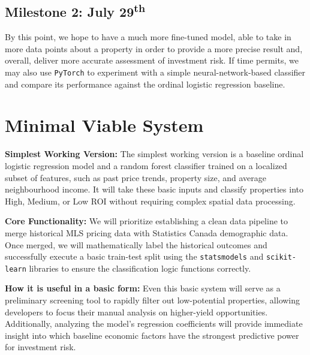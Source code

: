 \documentclass{article}
\begin{document}
\subsection*{Milestone 2: July 29\textsuperscript{th}}

By this point, we hope to have a much more fine-tuned model, able to take in more data points about a property in order to provide a more precise result and, overall, deliver more accurate assessment of investment risk. If time permits, we may also use \texttt{PyTorch} to experiment with a simple neural-network-based classifier and compare its performance against the ordinal logistic regression baseline.

\section*{Minimal Viable System}

\noindent \textbf{Simplest Working Version: }
The simplest working version is a baseline ordinal logistic regression model and a random forest classifier trained on a localized subset of features, such as past price trends, property size, and average neighbourhood income. It will take these basic inputs and classify properties into High, Medium, or Low ROI without requiring complex spatial data processing.

\vspace{0.5cm}

\noindent \textbf{Core Functionality: }
We will prioritize establishing a clean data pipeline to merge historical MLS pricing data with Statistics Canada demographic data. Once merged, we will mathematically label the historical outcomes and successfully execute a basic train-test split using the \texttt{statsmodels} and \texttt{scikit-learn} libraries to ensure the classification logic functions correctly.

\vspace{0.5cm}
\noindent \textbf{How it is useful in a basic form: }
Even this basic system will serve as a preliminary screening tool to rapidly filter out low-potential properties, allowing developers to focus their manual analysis on higher-yield opportunities. Additionally, analyzing the model's regression coefficients will provide immediate insight into which baseline economic factors have the strongest predictive power for investment risk.
\end{document}
